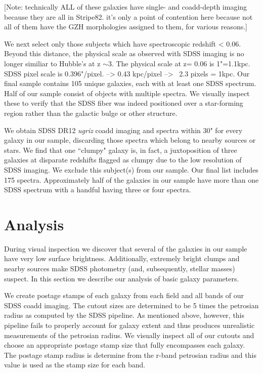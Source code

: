  [Note: technically ALL of these galaxies have single- and coadd-depth imaging because they are all in Stripe82. it's only a point of contention here because not all of them have the GZH morphologies assigned to them, for various reasons.]


We next select only those subjects which have spectroscopic redshift < 0.06. Beyond this distance, the physical scale as observed with SDSS imaging is no longer similiar to Hubble's at z $\sim3$. The physical scale at z= 0.06 is 1"=1.1kpc. SDSS pixel scale is 0.396"/pixel. --> 0.43 kpc/pixel -->  ~2.3 pixels = 1kpc.   Our final sample contains 105 unique galaxies, each with at least one SDSS spectrum. Half of our sample consist of objects with multiple spectra. We visually inspect these to verify that the SDSS fiber was indeed positioned over a star-forming region rather than the galactic bulge or other structure. 

We obtain SDSS DR12 \textit{ugriz} coadd imaging and spectra within 30" for every galaxy in our sample, discarding those spectra which belong to nearby sources or stars. We find that one ``clumpy" galaxy is, in fact, a juxtoposition of three galaxies at disparate redshifts flagged as clumpy due to the low resolution of SDSS imaging. We exclude this subject(s) from our sample.  Our final list includes 175 spectra. Approximately half of the galaxies in our sample have more than one SDSS spectrum with a handful having three or four spectra.  



\section{Analysis}
During visual inspection we discover that several of the galaxies in our sample have very low surface brightness. Additionally, extremely bright clumps and nearby sources make SDSS photometry (and, subsequently, stellar masses) suspect. In this section we describe our analysis of basic galaxy parameters. 

We create postage stamps of each galaxy from each field and all bands of our SDSS coadd imaging. The cutout sizes are determined to be 5 times the petrosian radius as computed by the SDSS pipeline. As mentioned above, however, this pipeline fails to properly account for galaxy extent and thus produces unrealistic measurements of the petrosian radius. We visually inspect all of our cutouts and choose an appropriate postage stamp size that fully encompasses each galaxy. The postage stamp radius is determine from the r-band petrosian radius and this value is used as the stamp size for each band. 

